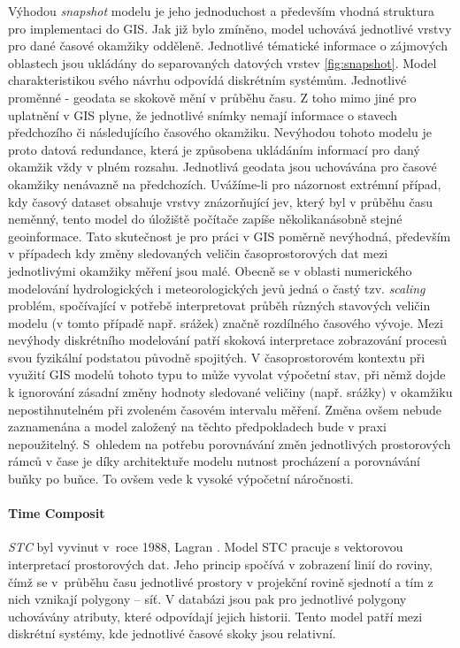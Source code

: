 \documentclass[a4paper,12pt,oneside]{report}
\begin{document}
Výhodou \textit{snapshot} modelu je jeho jednoduchost a především
vhodná struktura pro implementaci do GIS. Jak již bylo zmíněno, model
uchovává jednotlivé vrstvy pro dané časové okamžiky odděleně.
Jednotlivé tématické informace o zájmových oblastech jsou ukládány do
separovaných datových vrstev \ref{fig:snapshot}.  Model
charakte\-ristikou svého návrhu odpovídá diskrétním
systémům. Jednotlivé proměnné - geodata se skokově mění v průběhu
času. Z toho mimo jiné pro uplatnění v GIS plyne, že jednotlivé snímky
nemají informace o stavech předchozího či následujícího časového
okamžiku.  Nevýhodou tohoto modelu je proto datová redundance, která
je způsobena ukládáním informací pro daný okamžik vždy v plném
rozsahu.  Jednotlivá geodata jsou uchovávána pro časové okamžiky
nenávazně na předchozích. Uvážíme-li pro názornost extrémní případ,
kdy časový dataset obsahuje vrstvy znázorňující jev, který byl v
průběhu času neměnný, tento model do úložiště počítače zapíše
několikanásobně stejné geoinformace. Tato skutečnost je pro práci v
GIS poměrně nevýhodná, především v případech kdy změny sledovaných
veličin časoprostorových dat mezi jednotlivými okamžiky měření jsou
malé. Obecně se v oblasti numeri\-ckého modelování hydrologických i
meteorologických jevů jedná o častý tzv. {\em scaling} problém,
spočívající v potřebě interpretovat průběh různých stavových veličin
modelu (v tomto případě např. srážek) značně rozdílného časového
vývoje. Mezi nevýhody diskrétního modelování patří skoková
interpretace zobrazování procesů svou fyzikální podstatou původně
spojitých. V časoprostorovém kontextu při využití GIS modelů tohoto
typu to může vyvolat výpočetní stav, při němž dojde k igno\-rování
zásadní změny hodnoty sledované veličiny (např. srážky) v okamžiku
nepostihnutelném při zvoleném časovém intervalu měření.  Změna ovšem
nebude zaznamenána a model založený na těchto předpokladech bude v
praxi nepoužitelný. S~ohledem na potřebu porovnávání změn
jednotlivých prostorových rámců v čase je díky architektuře modelu
nutnost procházení a porovnávání buňky po buňce. To ovšem vede k
vysoké výpočetní náročnosti.

\paragraph*{Time Composit}
\textit{\ac{STC}} byl vyvinut v~roce
1988, Lagran \cite{lagran}. Model \acs{STC} pracuje s vektorovou interpretací
 prostorových dat. Jeho princip  spočívá v zobrazení linií do roviny, čímž se v~průběhu času jednotlivé prostory v projekční rovině sjednotí a tím z
nich vznikají polygony -- síť. V databázi jsou pak pro jednotlivé
polygony uchovávány atributy, které odpovídají jejich historii. Tento model
patří mezi diskrétní systémy, kde jednotlivé časové skoky
jsou relativní.
\end{document}
